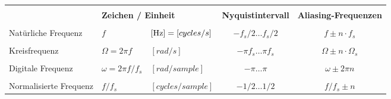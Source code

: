 	\begin{tabular}{|l|ll|c|c|}
	\hline&&&&\\[-0.35cm]
		& \multicolumn{2}{l|}{\textbf{Zeichen / Einheit}} & \textbf{Nyquistintervall} & \textbf{Aliasing-Frequenzen} \\[0.05cm]
	\hline&&&&\\[-0.35cm]
		Natürliche Frequenz &$f$ &$[\text{Hz}] = [cycles/s]$ & $-f_s/2 \dots f_s/2 $ & $f\pm n\cdot f_s$\\[0.05cm]
	\hline&&&&\\[-0.35cm]
		Kreisfrequenz & $\Omega = 2\pi f$ &$[rad/s]$ & $-\pi f_s \dots \pi f_s $ & $\Omega\pm n\cdot\Omega_s$\\[0.05cm]
	\hline&&&&\\[-0.35cm]
		Digitale Frequenz & $\omega = 2\pi f/f_s$ &$[rad/sample]$ & $-\pi \dots \pi $ & $\omega \pm 2\pi n $\\[0.05cm]
	\hline&&&&\\[-0.35cm]
		Normalisierte Frequenz & $f/f_s$ &$[cycles/sample]$& $-1/2\dots 1/2 $ & $f/f_s\pm n $\\[0.05cm]
	\hline
	\end{tabular}\\[0.3cm]

